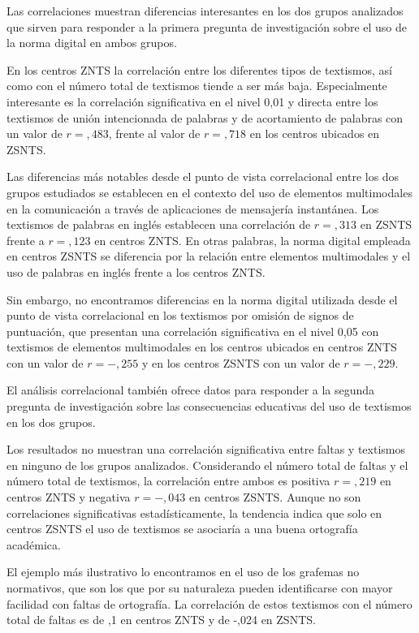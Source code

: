 \documentclass[spanish]{textolivre}
\begin{document}
Las correlaciones muestran diferencias interesantes en los dos grupos analizados que sirven para responder a la primera pregunta de investigación sobre el uso de la norma digital en ambos grupos.

En los centros ZNTS la correlación entre los diferentes tipos de textismos, así como con el número total de textismos tiende a ser más baja. Especialmente interesante es la correlación significativa en el nivel 0,01 y directa entre los textismos de unión intencionada de palabras y de acortamiento de palabras con un valor de $r=,483$, frente al valor de $r=,718$ en los centros ubicados en ZSNTS.

Las diferencias más notables desde el punto de vista correlacional entre los dos grupos estudiados se establecen en el contexto del uso de elementos multimodales en la comunicación a través de aplicaciones de mensajería instantánea.  Los textismos de palabras en inglés establecen una correlación de $r=,313$ en ZSNTS frente a $r=,123$ en centros ZNTS. En otras palabras, la norma digital empleada en centros ZSNTS se diferencia por la relación entre elementos multimodales y el uso de palabras en inglés frente a los centros ZNTS.  

Sin embargo, no encontramos diferencias en la norma digital utilizada desde el punto de vista correlacional en los textismos por omisión de signos de puntuación, que presentan una correlación significativa en el nivel 0,05 con textismos de elementos multimodales en los centros ubicados en centros ZNTS con un valor de $r=-,255$ y en los centros ZSNTS con un valor de $r=-,229$.

El análisis correlacional también ofrece datos para responder a la segunda pregunta de investigación sobre las consecuencias educativas del uso de textismos en los dos grupos. 

Los resultados no muestran una correlación significativa entre faltas y textismos en ninguno de los grupos analizados. Considerando el número total de faltas y el número total de textismos, la correlación entre ambos es positiva $r=,219$ en centros ZNTS y negativa $r=-,043$ en centros ZSNTS. Aunque no son correlaciones significativas estadísticamente, la tendencia indica que solo en centros ZSNTS el uso de textismos se asociaría a una buena ortografía académica. 

El ejemplo más ilustrativo lo encontramos en el uso de los grafemas no normativos, que son los que por su naturaleza pueden identificarse con mayor facilidad con faltas de ortografía. La correlación de estos textismos con el número total de faltas es de ,1 en centros ZNTS y de -,024 en ZSNTS. 
\end{document}
